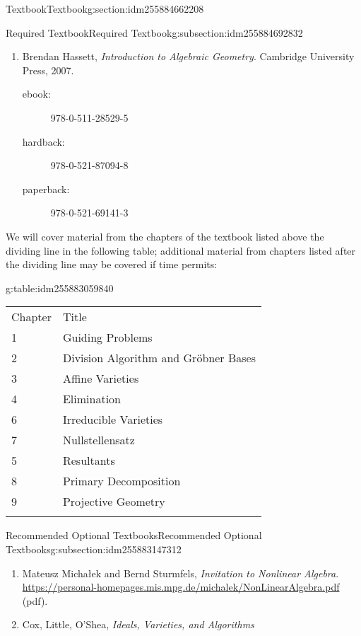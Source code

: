 \documentclass[oneside,10pt,]{article}
\newcommand{\tabularfont}{\relax}
\newcommand{\pubtitle}[1]{\textsl{#1}}
\newcommand{\hrulethin}  {\noalign{\hrule height 0.04em}}
\newcommand{\hrulethick} {\noalign{\hrule height 0.11em}}
\begin{document}
\begin{sectionptx}{Textbook}{}{Textbook}{}{}{g:section:idm255884662208}
%
%
\typeout{************************************************}
\typeout{************************************************}
%
\begin{subsectionptx}{Required Textbook}{}{Required Textbook}{}{}{g:subsection:idm255884692832}
%
\begin{enumerate}
\item{}Brendan Hassett, \pubtitle{Introduction to Algebraic Geometry}. Cambridge University Press, 2007.%
\begin{description}
\item[{ebook:}] 978-0-511-28529-5\item[{hardback:}] 978-0-521-87094-8\item[{paperback:}] 978-0-521-69141-3\end{description}
%
\end{enumerate}
%
\par
We will cover material from the chapters of the textbook listed above the dividing line in the following table; additional material from chapters listed after the dividing line may be covered if time permits: \begin{tableptx}{\textbf{}}{g:table:idm255883059840}{}%
\centering
{\tabularfont%
\begin{tabular}{ll}\hrulethick
Chapter&Title\tabularnewline\hrulethin
1&Guiding Problems\tabularnewline[0pt]
2&Division Algorithm and Gröbner Bases\tabularnewline[0pt]
3&Affine Varieties\tabularnewline[0pt]
4&Elimination\tabularnewline[0pt]
6&Irreducible Varieties\tabularnewline[0pt]
7&Nullstellensatz\tabularnewline\hrulethin
5&Resultants\tabularnewline[0pt]
8&Primary Decomposition\tabularnewline[0pt]
9&Projective Geometry\tabularnewline\hrulethick
\end{tabular}
}%
\end{tableptx}%
%
\end{subsectionptx}
%
%
\typeout{************************************************}
\typeout{************************************************}
%
\begin{subsectionptx}{Recommended Optional Textbooks}{}{Recommended Optional Textbooks}{}{}{g:subsection:idm255883147312}
%
\begin{enumerate}
\item{}Mateusz Michałek and Bernd Sturmfels, \pubtitle{Invitation to Nonlinear Algebra}. \url{https://personal-homepages.mis.mpg.de/michalek/NonLinearAlgebra.pdf} (pdf).%
\item{}Cox, Little, O'Shea, \pubtitle{Ideals, Varieties, and Algorithms}%
\end{enumerate}
%
\end{subsectionptx}
\end{sectionptx}
\end{document}
